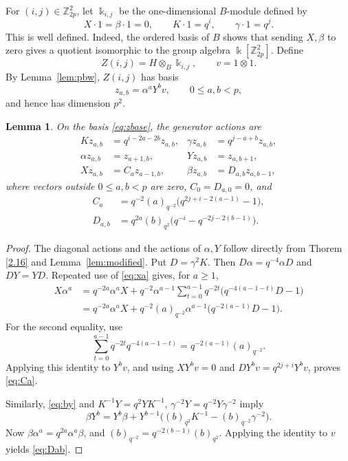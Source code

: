 \documentclass[10pt,oneside]{amsart}
\newcommand{\kk}{\Bbbk}
\newcommand{\Z}{\mathbb Z}
\newtheorem{lemma}[proposition]{Lemma}
\theoremstyle{definition}
\begin{document}
For $(i,j)\in\Z_{2p}^2$, let $\kk_{i,j}$ be the one-dimensional $B$-module defined by
\[
 X\cdot1=\beta\cdot1=0,\qquad K\cdot1=q^i,\qquad\gamma\cdot1=q^j.
\]
This is well defined. Indeed, the ordered basis of $B$ shows that sending $X,\beta$ to zero gives a quotient isomorphic to the group algebra $\kk[\Z_{2p}^2]$. Define
\begin{equation}
 Z(i,j)=H\otimes_B\kk_{i,j},\qquad v=1\otimes1.
 \label{eq:induced}
\end{equation}
By Lemma~\ref{lem:pbw}, $Z(i,j)$ has basis
\begin{equation}
 z_{a,b}=\alpha^aY^bv,\qquad 0\le a,b<p,
 \label{eq:zbase}
\end{equation}
and hence has dimension $p^2$.

\begin{lemma}\label{lem:action}
On the basis \eqref{eq:zbase}, the generator actions are
\begin{align}
 Kz_{a,b}&=q^{i-2a-2b}z_{a,b},&
 \gamma z_{a,b}&=q^{j-a+b}z_{a,b},\label{eq:zweights}\\
 \alpha z_{a,b}&=z_{a+1,b},&Yz_{a,b}&=z_{a,b+1},\label{eq:zraise}\\
 Xz_{a,b}&=C_a z_{a-1,b},&\beta z_{a,b}&=D_{a,b}z_{a,b-1},\label{eq:zlower}
\end{align}
where vectors outside $0\le a,b<p$ are zero, $C_0=D_{a,0}=0$, and
\begin{align}
 C_a&=q^{-2}(a)_{q^{-2}}\bigl(q^{2j+i-2(a-1)}-1\bigr),\label{eq:Ca}\\
 D_{a,b}&=q^{2a}(b)_{q^2}\bigl(q^{-i}-q^{-2j-2(b-1)}\bigr).\label{eq:Dab}
\end{align}
\end{lemma}
\begin{proof}
The diagonal actions and the actions of $\alpha,Y$ follow directly from Thorem \ref{2.16} and Lemma~\ref{lem:modified}. Put $D=\gamma^2K$. Then $D\alpha=q^{-4}\alpha D$ and $DY=YD$. Repeated use of \eqref{eq:xa} gives, for $a\ge1$,
\begin{align*}
 X\alpha^a
 &=q^{-2a}\alpha^aX
 +q^{-2}\alpha^{a-1}\sum_{t=0}^{a-1}q^{-2t}
       \bigl(q^{-4(a-1-t)}D-1\bigr)\\
 &=q^{-2a}\alpha^aX
 +q^{-2}(a)_{q^{-2}}\alpha^{a-1}
       \bigl(q^{-2(a-1)}D-1\bigr).
\end{align*}
For the second equality, use
\[
 \sum_{t=0}^{a-1}q^{-2t}q^{-4(a-1-t)}
   =q^{-2(a-1)}(a)_{q^{-2}}.
\]
Applying this identity to $Y^bv$, and using $XY^bv=0$ and $DY^bv=q^{2j+i}Y^bv$, proves \eqref{eq:Ca}.

Similarly, \eqref{eq:by} and
$K^{-1}Y=q^2YK^{-1}$, $\gamma^{-2}Y=q^{-2}Y\gamma^{-2}$ imply
\[
 \beta Y^b=Y^b\beta+
 Y^{b-1}\bigl((b)_{q^2}K^{-1}-(b)_{q^{-2}}\gamma^{-2}\bigr).
\]
Now $\beta\alpha^a=q^{2a}\alpha^a\beta$, and
$(b)_{q^{-2}}=q^{-2(b-1)}(b)_{q^2}$. Applying the identity to $v$ yields \eqref{eq:Dab}.
\end{proof}
\end{document}
